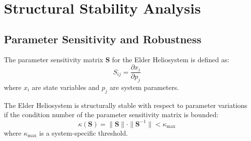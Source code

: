 \section{Structural Stability Analysis}

\subsection{Parameter Sensitivity and Robustness}

\begin{definition}
The parameter sensitivity matrix $\mathbf{S}$ for the Elder Heliosystem is defined as:
\begin{equation}
S_{ij} = \frac{\partial x_i}{\partial p_j}
\end{equation}
where $x_i$ are state variables and $p_j$ are system parameters.
\end{definition}

\begin{theorem}
The Elder Heliosystem is structurally stable with respect to parameter variations if the condition number of the parameter sensitivity matrix is bounded:
\begin{equation}
\kappa(\mathbf{S}) = \|\mathbf{S}\| \cdot \|\mathbf{S}^{-1}\| < \kappa_{\text{max}}
\end{equation}
where $\kappa_{\text{max}}$ is a system-specific threshold.
\end{theorem}

